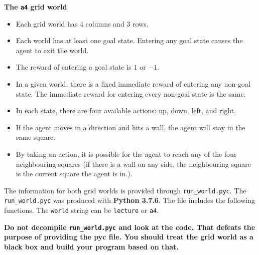 \documentclass[12pt]{article}
\begin{document}
{\bf The \verb+a4+ grid world}
\begin{itemize}
\item Each grid world has 4 columns and 3 rows.
\item Each world has at least one goal state. Entering any goal state causes the agent to exit the world.
\item The reward of entering a goal state is $1$ or $-1$.
\item In a given world, there is a fixed immediate reward of entering any non-goal state. The immediate reward for entering every non-goal state is the same.
\item In each state, there are four available actions: up, down, left, and right. 
\item If the agent moves in a direction and hits a wall, the agent will stay in the same square.
\item By taking an action, it is possible for the agent to reach any of the four neighbouring squares (if there is a wall on any side, the neighbouring square is the current square the agent is in.).
\end{itemize}

The information for both grid worlds is provided through \verb+run_world.pyc+. The \verb+run_world.pyc+ was produced with {\bf Python 3.7.6}. The file includes the following functions. The \verb+world+ string can be \verb+lecture+ or \verb+a4+.

{\bf Do not decompile \verb+run_world.pyc+ and look at the code. That defeats the purpose of providing the pyc file. You should treat the grid world as a black box and build your program based on that.}
\end{document}
